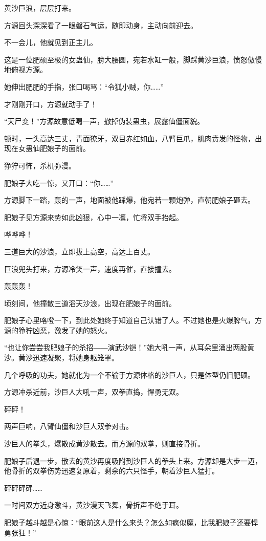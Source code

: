 \begin{this_body}
黄沙巨浪，层层打来。

方源回头深深看了一眼磐石气运，随即动身，主动向前迎去。

不一会儿，他就见到正主儿。

这是一位肥硕至极的女蛊仙，膀大腰圆，宛若水缸一般，脚踩黄沙巨浪，愤怒傲慢地俯视方源。

她伸出肥肥的手指，张口喝骂：“令狐小贼，你……”

才刚刚开口，方源就动手了！

“天尸变！”方源故意低喝一声，撤掉伪装蛊虫，展露仙僵面貌。

顿时，一头高达三丈，青面獠牙，双目赤红如血，八臂巨爪，肌肉贲发的怪物，出现在女蛊仙肥娘子的面前。

狰狞可怖，杀机弥漫。

肥娘子大吃一惊，又开口：“你……”

方源脚下一踏，轰的一声，地面被他踩爆，他宛若一颗炮弹，直朝肥娘子砸去。

肥娘子见方源来势如此凶狠，心中一凛，忙将双手抬起。

哗哗哗！

三道巨大的沙浪，立即拔上高空，高达上百丈。

巨浪兜头打来，方源冷笑一声，速度再催，直接撞去。

轰轰轰！

顷刻间，他撞散三道滔天沙浪，出现在肥娘子的面前。

肥娘子心里咯噔一下，到此处她终于知道自己认错了人。不过她也是火爆脾气，方源的狰狞凶恶，激发了她的怒火。

“也让你尝尝我肥娘子的杀招――演武沙铠！”她大吼一声，从耳朵里涌出两股黄沙。黄沙迅速凝聚，将她身躯笼罩。

几个呼吸的功夫，她就化为一个不输于方源体格的沙巨人，只是体型仍旧肥硕。

方源冲杀近前，沙巨人大吼一声，双拳直捣，悍勇无双。

砰砰！

两声巨响，八臂仙僵和沙巨人双拳对击。

沙巨人的拳头，爆散成黄沙散去。而方源的双拳，则直接骨折。

肥娘子后退一步，散去的黄沙再度吸附到沙巨人的拳头上来。方源却是大步一迈，他骨折的双拳伤势迅速复原着，剩余的六只怪手，朝着沙巨人猛打。

砰砰砰砰……

一时间双方近身激斗，黄沙漫天飞舞，骨折声不绝于耳。

肥娘子越斗越是心惊：“眼前这人是什么来头？怎么如疯似魔，比我肥娘子还要悍勇张狂！”

\end{this_body}

